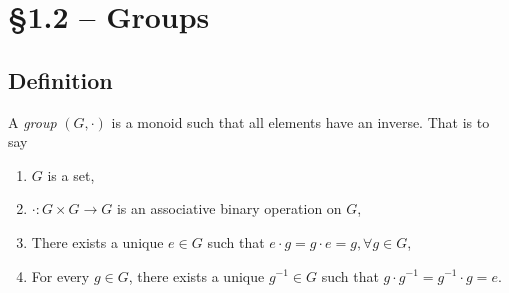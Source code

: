 \documentclass{article}
\begin{document}
\section{\S 1.2 -- Groups}

\subsection{Definition}

\begin{defn}[Group]
  \label{def:group}
  A \emph{group} $(G, \cdot)$ is a monoid such that all elements have an inverse.
  That is to say
  \begin{enumerate}
    \item{$G$ is a set,
         }
    \item{$\cdot : G \times G \to G$ is an associative binary operation on $G$,
         }
    \item{There exists a unique $e \in G$ such that 
          $e \cdot g = g \cdot e = g, \forall g \in G$,
         }
    \item{For every $g \in G$, there exists a unique $g^{-1} \in G$ such that
          $g \cdot g^{-1} = g^{-1} \cdot g = e$.
         }
  \end{enumerate}
\end{defn}
\end{document}
